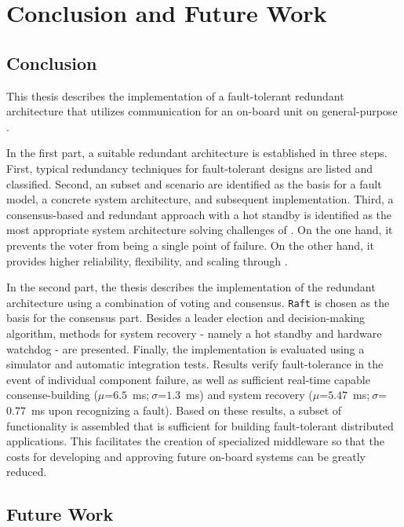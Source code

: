 \chapter{Conclusion and Future Work}

\section{Conclusion}
This thesis describes the implementation of a fault-tolerant redundant architecture that utilizes  communication for an  on-board unit on general-purpose .

In the first part, a suitable redundant architecture is established in three steps.
First, typical redundancy techniques for fault-tolerant designs are listed and classified.
Second, an  subset and scenario are identified as the basis for a fault model, a concrete system architecture, and subsequent implementation.
Third, a consensus-based and redundant approach with a hot standby is identified as the most appropriate system architecture solving challenges of .
On the one hand, it prevents the voter from being a single point of failure.
On the other hand, it provides higher reliability, flexibility, and scaling through .

In the second part, the thesis describes the implementation of the redundant architecture using a combination of voting and consensus.
\texttt{Raft} is chosen as the basis for the consensus part.
Besides a leader election and decision-making algorithm, methods for system recovery - namely a hot standby and hardware watchdog - are presented.
Finally, the implementation is evaluated using a simulator and automatic integration tests.
Results verify fault-tolerance in the event of individual component failure, as well as sufficient real-time capable consense-building ($\mu$=$6.5$~ms;$~\sigma$=$1.3$~ms) and system recovery ($\mu$=$5.47$~ms;$~\sigma$=$0.77$~ms upon recognizing a fault).
Based on these results, a subset of  functionality is assembled that is sufficient for building fault-tolerant distributed applications.
This facilitates the creation of specialized  middleware so that the costs for developing and approving future  on-board systems can be greatly reduced.


\section{Future Work}

